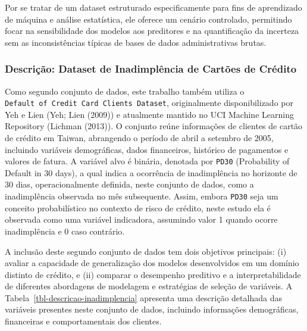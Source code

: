 \documentclass[
  brazilian,
  12pt,
  letterpaper,
  DIV=11,
  numbers=noendperiod]{scrartcl}
\begin{document}
Por se tratar de um dataset estruturado especificamente para fins de
aprendizado de máquina e análise estatística, ele oferece um cenário
controlado, permitindo focar na sensibilidade dos modelos aos preditores
e na quantificação da incerteza sem as inconsistências típicas de bases
de dados administrativas brutas.

\subsubsection{Descrição: Dataset de Inadimplência de Cartões de
Crédito}\label{descriuxe7uxe3o-dataset-de-inadimpluxeancia-de-cartuxf5es-de-cruxe9dito}

Como segundo conjunto de dados, este trabalho também utiliza o
\texttt{Default\ of\ Credit\ Card\ Clients\ Dataset}, originalmente
disponibilizado por Yeh e Lien (Yeh; Lien (2009)) e atualmente mantido
no UCI Machine Learning Repository (Lichman (2013)). O conjunto reúne
informações de clientes de cartão de crédito em Taiwan, abrangendo o
período de abril a setembro de 2005, incluindo variáveis demográficas,
dados financeiros, histórico de pagamentos e valores de fatura. A
variável alvo é binária, denotada por \texttt{PD30} (Probability of
Default in 30 days), a qual indica a ocorrência de inadimplência no
horizonte de 30 dias, operacionalmente definida, neste conjunto de
dados, como a inadimplência observada no mês subsequente. Assim, embora
\texttt{PD30} seja um conceito probabilístico no contexto de risco de
crédito, neste estudo ela é observada como uma variável indicadora,
assumindo valor 1 quando ocorre inadimplência e 0 caso contrário.

A inclusão deste segundo conjunto de dados tem dois objetivos
principais: (i) avaliar a capacidade de generalização dos modelos
desenvolvidos em um domínio distinto de crédito, e (ii) comparar o
desempenho preditivo e a interpretabilidade de diferentes abordagens de
modelagem e estratégias de seleção de variáveis. A
Tabela~\ref{tbl-descricao-inadimplencia} apresenta uma descrição
detalhada das variáveis presentes neste conjunto de dados, incluindo
informações demográficas, financeiras e comportamentais dos clientes.
\end{document}
